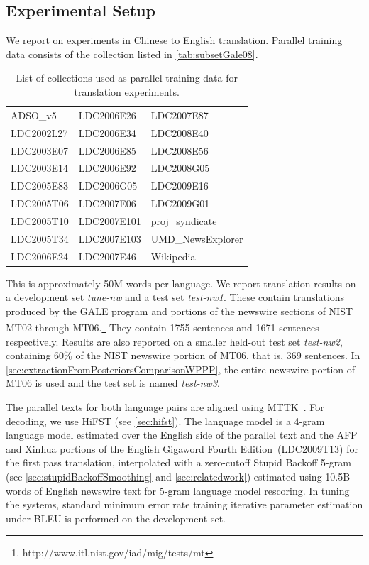 \subsection{Experimental Setup}
\label{sec:extractionFromPosteriorsExperimentalSetup}

We report on experiments in Chinese to English translation.
Parallel training data
consists of the collection listed in \autoref{tab:subsetGale08}.
%
\begin{table}
\begin{center}
\begin{tabular}{|l|l|l|}
\hline
ADSO\_v5   & LDC2006E26 & LDC2007E87 \\
LDC2002L27 & LDC2006E34 & LDC2008E40 \\
LDC2003E07 & LDC2006E85 & LDC2008E56 \\
LDC2003E14 & LDC2006E92 & LDC2008G05 \\
LDC2005E83 & LDC2006G05 & LDC2009E16 \\
LDC2005T06 & LDC2007E06 & LDC2009G01 \\
LDC2005T10 & LDC2007E101 & proj\_syndicate \\
LDC2005T34 & LDC2007E103 & UMD\_NewsExplorer \\
LDC2006E24 & LDC2007E46 & Wikipedia \\
\hline
\end{tabular}
\end{center}
\caption{List of collections used as parallel training data for translation experiments.}
\label{tab:subsetGale08}
\end{table}
%
This is
approximately 50M words per language. We report translation results on a
development set \emph{tune-nw} and a test set \emph{test-nw1}. These contain
translations produced by the GALE program and portions of the newswire sections
of NIST MT02 through MT06.\footnote{http://www.itl.nist.gov/iad/mig/tests/mt}
They contain 1755 sentences and 1671 sentences respectively. Results are also
reported on a smaller held-out test set {\it test-nw2}, containing 60\% of the
NIST newswire portion of MT06, that is, 369 sentences.
In \autoref{sec:extractionFromPosteriorsComparisonWPPP}, the entire newswire
portion of MT06 is used and the test set is named \emph{test-nw3}.

The parallel texts for both language pairs are aligned using
MTTK~\citep{deng-byrne:2005:HLTEMNLP,deng-and-byrne:2008:ASLP}. For decoding,
we use HiFST (see \autoref{sec:hifst}). The language model
is a 4-gram language model estimated over the English side of the parallel text
and the AFP and Xinhua portions of the English Gigaword Fourth
Edition~(LDC2009T13) for the first pass translation, interpolated with a
zero-cutoff Stupid Backoff
5-gram (see \autoref{sec:stupidBackoffSmoothing} and
\autoref{sec:relatedwork}) estimated using 10.5B words of English newswire text for 5-gram language
model rescoring. In tuning the systems, standard minimum error rate training
iterative parameter estimation under BLEU is performed on the development set.

